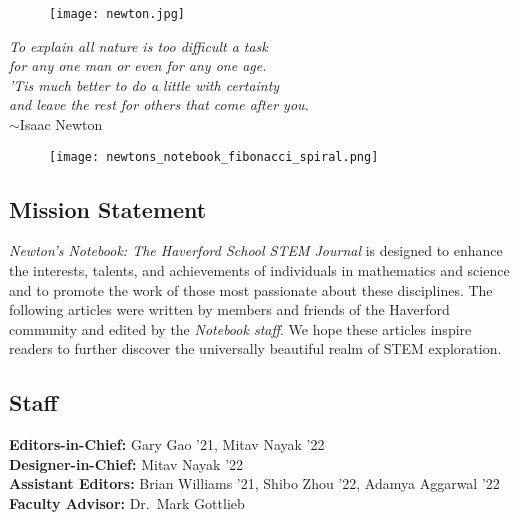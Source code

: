\documentclass[12pt]{article}
\theoremstyle{definition}
\begin{document}
\setcounter{tocdepth}{1}



\begin{figure}[H]
    \centering \texttt{[image: newton.jpg]}
\end{figure}

\begin{center}
    \textit{To explain all nature is too difficult a task\\
    for any one man or even for any one age.\\
    'Tis much better to do a little with certainty\\
    and leave the rest for others that come after you.}\\
    	$\sim$Isaac Newton
\end{center}

\newpage
\begin{spacing}{1}
\tableofcontents
\end{spacing}

\begin{figure}[H]
    \centering
    \vspace*{75pt}
    \texttt{[image: newtons\_notebook\_fibonacci\_spiral.png]}
\end{figure}

\newpage
\subsection*{Mission Statement}
\textit{Newton’s Notebook: The Haverford School STEM Journal} is designed to enhance the interests, talents, and achievements of individuals in mathematics and science and to promote the work of those most passionate about these disciplines. The following articles were written by members and friends of the Haverford community and edited by the \textit{Notebook staff}. We hope these articles inspire readers to further discover the universally beautiful realm of STEM exploration. 
\subsection*{Staff}
{\centering{}
    \textbf{Editors-in-Chief:} Gary Gao '21, Mitav Nayak '22
    \\
    \textbf{Designer-in-Chief:} Mitav Nayak '22
    \\ 
    \textbf{Assistant Editors:} Brian Williams '21, Shibo Zhou '22, Adamya Aggarwal '22
    \\
    \textbf{Faculty Advisor:} Dr.\ Mark Gottlieb
    \\}
\end{document}
